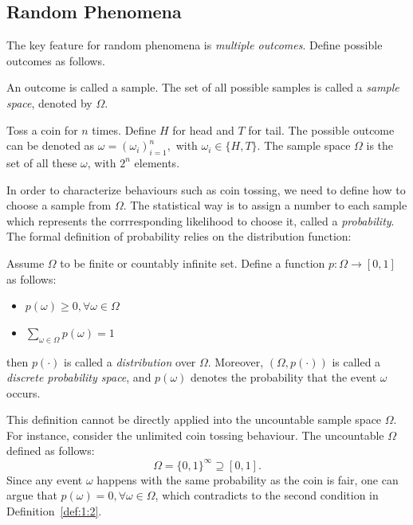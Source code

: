 \subsection{Random Phenomena}
The key feature for random phenomena is \emph{multiple outcomes}.
Define possible outcomes as follows.
\begin{definition}
An outcome is called a sample.
The set of all possible samples is called a \emph{sample space}, denoted by $\Omega$.
\end{definition}


\begin{example}
Toss a coin for $n$ times.
Define $H$ for head and $T$ for tail.
The possible outcome can be denoted as
$
\omega=(\omega_i)_{i=1}^n,$
with 
$
\omega_i\in\{H,T\}
$.
The sample space $\Omega$ is the set of all these $\omega$, with $2^n$ elements.
\end{example}

In order to characterize behaviours such as coin tossing, we need to define how to choose a sample from $\Omega$. 
The statistical way is to assign a number to each sample which represents the corrresponding likelihood to choose it, called a \emph{probability}. 
The formal definition of probability relies on the distribution function:
\begin{definition}[Distribution]\label{def:1:2}
Assume $\Omega$ to be finite or countably infinite set.
Define a function $p:\Omega\to[0,1]$ as follows:
\begin{itemize}
\item
$p(\omega)\ge0,\forall \omega\in\Omega$
\item
$\sum_{\omega\in\Omega}p(\omega)=1$
\end{itemize}
then $p(\cdot)$ is called a \emph{distribution} over $\Omega$.
Moreover, $(\Omega,p(\cdot))$ is called a \emph{discrete probability space}, and $p(\omega)$ denotes the probability that the event $\omega$ occurs.
\end{definition}
\begin{remark}
This definition cannot be directly applied into the uncountable sample space $\Omega$. For instance, consider the unlimited coin tossing behaviour.
The uncountable $\Omega$ defined as follows:
\[
\Omega=\{0,1\}^{\infty}\supseteq[0,1].
\]
Since any event $\omega$ happens with the same probability as the coin is fair, 
one can argue that $p(\omega)=0,\forall\omega\in\Omega$, which contradicts to the second condition in Definition~\ref{def:1:2}.
\end{remark}

